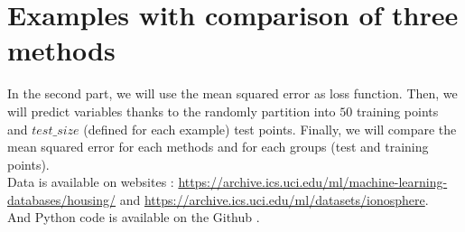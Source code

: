 \documentclass{article}
\begin{document}

\section{Examples with comparison of three methods}
 In the second part, we will use the mean squared error as loss function. Then, we will predict variables thanks to the randomly partition into $50$ training points and $test\_size$ (defined for each example) test points. Finally, we will compare the mean squared error for each methods and for each groups (test and training points).\\
 Data is available on websites : \href{https://archive.ics.uci.edu/ml/machine-learning-databases/housing/}{https://archive.ics.uci.edu/ml/machine-learning-databases/housing/}\cite{house} and \href{https://archive.ics.uci.edu/ml/datasets/ionosphere}{https://archive.ics.uci.edu/ml/datasets/ionosphere}\cite{iono}. \\
 And Python code is available on the Github \cite{code}.

\end{document}
